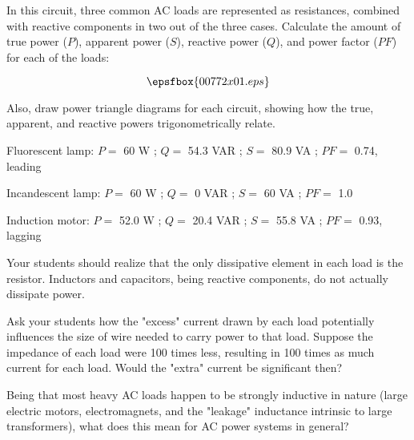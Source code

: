 

In this circuit, three common AC loads are represented as resistances, combined with reactive components in two out of the three cases.  Calculate the amount of true power ($P$), apparent power ($S$), reactive power ($Q$), and power factor ($PF$) for each of the loads:

$$\epsfbox{00772x01.eps}$$

Also, draw power triangle diagrams for each circuit, showing how the true, apparent, and reactive powers trigonometrically relate.







Fluorescent lamp: $P =$ 60 W ; $Q =$ 54.3 VAR ; $S =$ 80.9 VA ; $PF =$ 0.74, leading 

\vskip 10pt

Incandescent lamp: $P =$ 60 W ; $Q =$ 0 VAR ; $S =$ 60 VA ; $PF =$ 1.0

\vskip 10pt

Induction motor: $P =$ 52.0 W ; $Q =$ 20.4 VAR ; $S =$ 55.8 VA ; $PF =$ 0.93, lagging







Your students should realize that the only dissipative element in each load is the resistor.  Inductors and capacitors, being reactive components, do not actually dissipate power.

Ask your students how the "excess" current drawn by each load potentially influences the size of wire needed to carry power to that load.  Suppose the impedance of each load were 100 times less, resulting in 100 times as much current for each load.  Would the "extra" current be significant then?

Being that most heavy AC loads happen to be strongly inductive in nature (large electric motors, electromagnets, and the "leakage" inductance intrinsic to large transformers), what does this mean for AC power systems in general?




